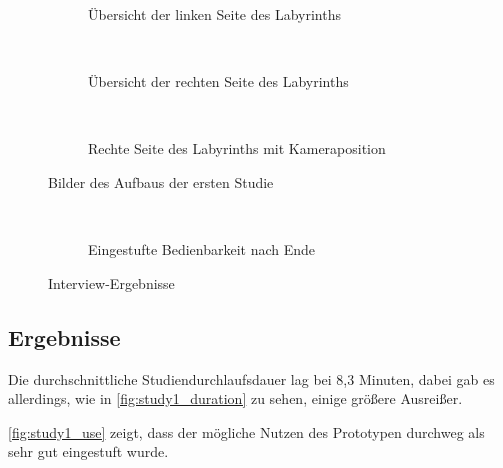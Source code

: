 \begin{figure}[t]
\begin{subfigure}[t]{0.3\textwidth}
		\caption{Übersicht der linken Seite des Labyrinths}
		\label{fig:study1_lab7}
	\end{subfigure}
	~
	\begin{subfigure}[t]{0.3\textwidth}
		\centering
		\caption{Übersicht der rechten Seite des Labyrinths}
		\label{fig:study1_lab8}
	\end{subfigure}
	~
	\begin{subfigure}[t]{0.3\textwidth}
		\centering
		\caption{Rechte Seite des Labyrinths mit Kameraposition}
		\label{fig:study1_lab9}
	\end{subfigure}
	\caption{Bilder des Aufbaus der ersten Studie}
	\label{fig:study1_lab}
\end{figure}

\begin{figure}[H]
	\begin{subfigure}[t]{0.45\textwidth}
		\centering
		
		\label{fig:study1_usa_pre}
	\end{subfigure}
	~
	\begin{subfigure}[t]{0.45\textwidth}
		\centering
		\caption{Eingestufte Bedienbarkeit nach Ende}
		\label{fig:study1_usa_post}
	\end{subfigure}
	\caption{Interview-Ergebnisse}
	\label{fig:study1_usa}
\end{figure}

\subsection{Ergebnisse}
Die durchschnittliche Studiendurchlaufsdauer lag bei 8,3 Minuten, dabei gab es allerdings, wie in \cref{fig:study1_duration} zu sehen, einige größere Ausreißer.

\cref{fig:study1_use} zeigt, dass der mögliche Nutzen des Prototypen durchweg als sehr gut eingestuft wurde.


